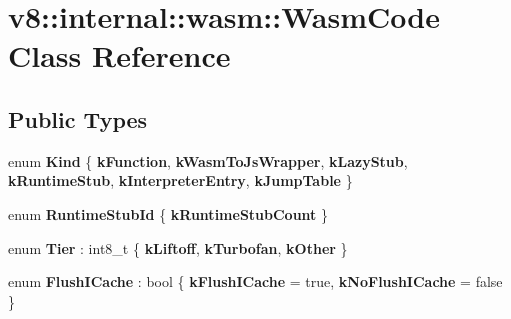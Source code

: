 \hypertarget{classv8_1_1internal_1_1wasm_1_1WasmCode}{}\section{v8\+:\+:internal\+:\+:wasm\+:\+:Wasm\+Code Class Reference}
\label{classv8_1_1internal_1_1wasm_1_1WasmCode}
\subsection*{Public Types}
\begin{DoxyCompactItemize}
\item 
\mbox{\label{classv8_1_1internal_1_1wasm_1_1WasmCode_a236d413616e672cc2cda31bb7a4fc04d}} 
enum {\bfseries Kind} \{ \newline
{\bfseries k\+Function}, 
{\bfseries k\+Wasm\+To\+Js\+Wrapper}, 
{\bfseries k\+Lazy\+Stub}, 
{\bfseries k\+Runtime\+Stub}, 
\newline
{\bfseries k\+Interpreter\+Entry}, 
{\bfseries k\+Jump\+Table}
 \}
\item 
\mbox{\label{classv8_1_1internal_1_1wasm_1_1WasmCode_a0b7d01506a679afa700cb2e77d2d8ff2}} 
enum {\bfseries Runtime\+Stub\+Id} \{ {\bfseries k\+Runtime\+Stub\+Count}
 \}
\item 
\mbox{\label{classv8_1_1internal_1_1wasm_1_1WasmCode_abec8b495a97ae37968abd000fff00952}} 
enum {\bfseries Tier} \+: int8\+\_\+t \{ {\bfseries k\+Liftoff}, 
{\bfseries k\+Turbofan}, 
{\bfseries k\+Other}
 \}
\item 
\mbox{\label{classv8_1_1internal_1_1wasm_1_1WasmCode_a467f7a5c62763b48caba978827a4c65a}} 
enum {\bfseries Flush\+I\+Cache} \+: bool \{ {\bfseries k\+Flush\+I\+Cache} = true, 
{\bfseries k\+No\+Flush\+I\+Cache} = false
 \}
\end{DoxyCompactItemize}
